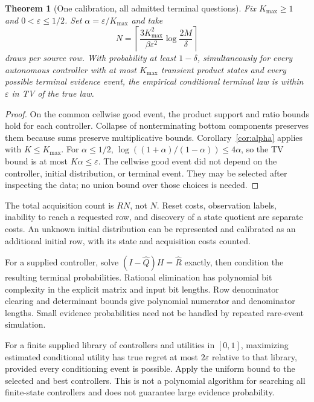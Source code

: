 \documentclass[11pt]{article}
\newtheorem{theorem}{Theorem}
\begin{document}
\begin{theorem}[One calibration, all admitted terminal questions]
Fix $K_{\max}\ge1$ and $0<\varepsilon\le1/2$. Set
$\alpha=\varepsilon/K_{\max}$ and take
\[
 N=\left\lceil\frac{3K_{\max}^2}{\beta\varepsilon^2}
                         \log\frac{2M}{\delta}\right\rceil
\]
draws per source row. With probability at least $1-\delta$,
simultaneously for every autonomous controller with at most $K_{\max}$
transient product states and every possible terminal evidence event,
the empirical conditional terminal law is within $\varepsilon$ in TV
of the true law.
\end{theorem}
\begin{proof}
On the common cellwise good event, the product support and ratio bounds
hold for each controller. Collapse of nonterminating bottom components
preserves them because sums preserve multiplicative bounds.
Corollary~\ref{cor:alpha} applies with $K\le K_{\max}$.
For $\alpha\le1/2$,
$\log((1+\alpha)/(1-\alpha))\le4\alpha$, so the TV bound is at most
$K\alpha\le\varepsilon$. The cellwise good event did not depend on the
controller, initial distribution, or terminal event. They may be selected
after inspecting the data; no union bound over those choices is needed.
\end{proof}

The total acquisition count is $RN$, not $N$. Reset costs, observation
labels, inability to reach a requested row, and discovery of a state
quotient are separate costs. An unknown initial distribution can be
represented and calibrated as an additional initial row, with its state
and acquisition costs counted.

For a supplied controller, solve $(I-\widehat Q)H=\widehat R$ exactly,
then condition the resulting terminal probabilities. Rational elimination
has polynomial bit complexity in the explicit matrix and input bit
lengths. Row denominator clearing and determinant bounds give polynomial
numerator and denominator lengths. Small evidence probabilities need not
be handled by repeated rare-event simulation.

For a finite supplied library of controllers and utilities in $[0,1]$,
maximizing estimated conditional utility has true regret at most
$2\varepsilon$ relative to that library, provided every conditioning
event is possible. Apply the uniform bound to the selected and best
controllers. This is not a polynomial algorithm for searching all
finite-state controllers and does not guarantee large evidence probability.
\end{document}
